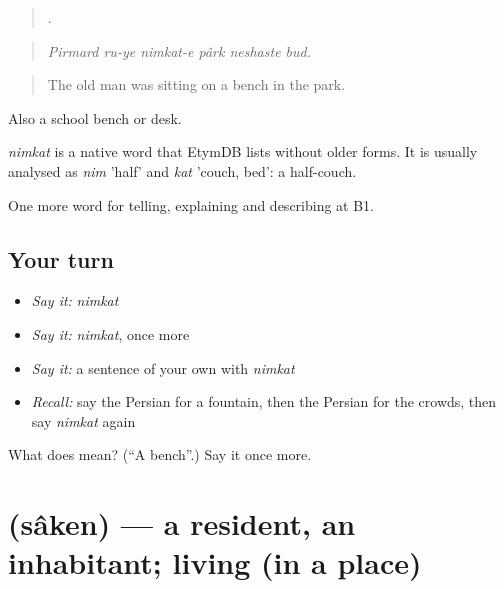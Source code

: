 \begin{quote}
     .
\end{quote}

\begin{quote}
\emph{Pirmard ru-ye nimkat-e pârk neshaste bud.}
\end{quote}

\begin{quote}
The old man was sitting on a bench in the park.
\end{quote}

Also a school bench or desk.

\begin{cousinweb}
\emph{nimkat} is a native word that EtymDB lists without older forms. It is usually analysed as \emph{nim} 'half' and \emph{kat} 'couch, bed': a half-couch.
\end{cousinweb}

\begin{grammarlens}[title={What you've built}]
One more word for telling, explaining and describing at B1.
\end{grammarlens}

\subsection*{Your turn}
\begin{itemize}
\raggedright
  \item \emph{Say it:} \emph{nimkat}
  \item \emph{Say it:} \emph{nimkat}, once more
  \item \emph{Say it:} a sentence of your own with \emph{nimkat}
  \item \emph{Recall:} say the Persian for a fountain, then the Persian for the crowds, then say \emph{nimkat} again
\end{itemize}

\begin{tcolorbox}[breakable,colback=teal!4,colframe=teal!35!black,title={Before you move on}]
What does  mean? (\textquotedblleft{}A bench\textquotedblright{}.) Say it once more.
\end{tcolorbox}
\section[\texorpdfstring{\fa{ساکن} (sâken)}{ساکن (sâken)}]{ (sâken) — a resident, an inhabitant; living (in a place)}

